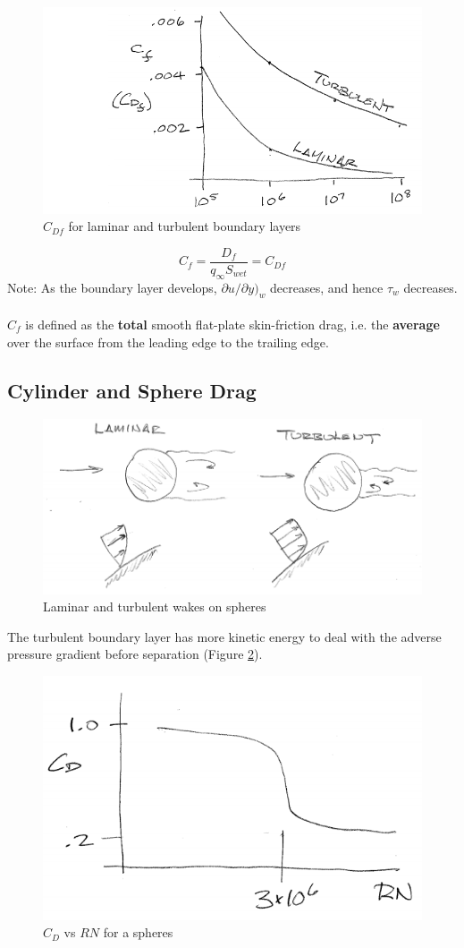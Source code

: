 \documentclass[draft=false, titlepage]{article}
\begin{document}
\begin{figure}[ht]
	\centering
	\includegraphics[width=0.6\linewidth]{Figures/p24_CdfBoundaryLayer.PNG}
	\caption{$C_{Df}$ for laminar and turbulent boundary layers}
	\label{fig:p24_CdfBoundaryLayer}
\end{figure}
\begin{equation*}
C_f = \frac{D_f}{q_\infty S_{wet}} = C_{Df}
\end{equation*}
Note: As the boundary layer develops, $\partial u / \partial y)_w$ decreases, and hence $\tau_w$ decreases.
\paragraph*{} $C_f$ is defined as the \textbf{total} smooth flat-plate skin-friction drag, i.e. the \textbf{average} over the surface from the leading edge to the trailing edge.

\subsection{Cylinder and Sphere Drag}
\begin{figure}[ht]
	\centering
	\includegraphics[width=0.7\linewidth]{Figures/p25_boundaryOnSpheres.PNG}
	\caption{Laminar and turbulent wakes on spheres}
	\label{fig:p25_boundaryOnSpheres}
\end{figure}
The turbulent boundary layer has more kinetic energy to deal with the adverse pressure gradient before separation (Figure \ref{fig:p25_boundaryOnSpheres}).
\begin{figure}[ht]
	\centering
	\includegraphics[width=0.4\linewidth]{Figures/p25_CdOnSphere.PNG}
	\caption{$C_D$ vs $RN$ for a spheres}
	\label{fig:p25_CdOnSphere}
\end{figure}
\end{document}
